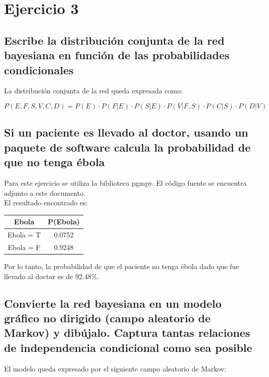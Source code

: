 \documentclass[letterpaper,12pt]{article}
\theoremstyle{definition}
\begin{document}
\section*{Ejercicio 3}

\subsection*{Escribe la distribución conjunta de la red bayesiana en función de las probabilidades condicionales}

La distribución conjunta de la red queda expresada como:

\begin{equation}
P(E,F,S,V,C,D) = P(E) \cdot P(F|E) \cdot P(S|E) \cdot P(V|F,S) \cdot P(C|S) \cdot P(D|V)
\end{equation}

\subsection*{Si un paciente es llevado al doctor, usando un paquete de software calcula la probabilidad de que no tenga ébola}

Para este ejercicio se utiliza la biblioteca pgmpy. El código fuente se encuentra adjunto a este documento.\\

El resultado encontrado es:

\begin{table}[H]
	\centering
	\begin{tabular}{|c|c|}
		\toprule
		Ebola & P(Ebola) \\
		\midrule
		Ebola = T & 0.0752 \\
		Ebola = F & 0.9248  \\
		\bottomrule
	\end{tabular}
\end{table}

Por lo tanto, la probabilidad de que el paciente no tenga ébola dado que fue llevado al doctor es de 92.48\%.


\subsection*{Convierte la red bayesiana en un modelo gráfico no dirigido (campo aleatorio de Markov) y dibújalo. Captura tantas relaciones de independencia condicional como sea posible}

El modelo queda expresado por el siguiente campo aleatorio de Markov:
\end{document}
